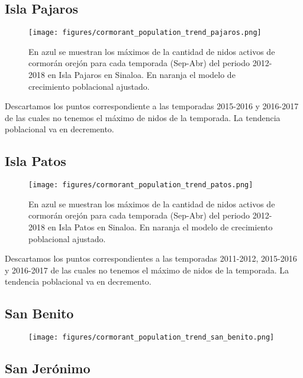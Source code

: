 \documentclass{article} %
\begin{document}
\subsection*{Isla Pajaros}

\begin{figure}[H]
\hspace{-2cm}
    \texttt{[image: figures/cormorant\_population\_trend\_pajaros.png]}
\caption{En azul se muestran los máximos de la cantidad de nidos activos de cormorán orejón para cada temporada (Sep-Abr) del periodo 2012-2018 en Isla Pajaros en Sinaloa. En naranja el modelo de crecimiento poblacional ajustado.}
\end{figure}

Descartamos los puntos correspondiente a las temporadas 2015-2016 y 2016-2017 de las cuales no tenemos el máximo de nidos de la temporada. La tendencia poblacional va en decremento.


\subsection*{Isla Patos}

\begin{figure}[H]
\hspace{-2cm}
    \texttt{[image: figures/cormorant\_population\_trend\_patos.png]}
\caption{En azul se muestran los máximos de la cantidad de nidos activos de cormorán orejón para cada temporada (Sep-Abr) del periodo 2012-2018 en Isla Patos en Sinaloa. En naranja el modelo de crecimiento poblacional ajustado.}
\end{figure}

Descartamos los puntos correspondientes a las temporadas 2011-2012, 2015-2016 y 2016-2017 de las cuales no tenemos el máximo de nidos de la temporada. La tendencia poblacional va en decremento.

\subsection*{San Benito}

\begin{figure}[H]
\hspace{-2cm}
    \texttt{[image: figures/cormorant\_population\_trend\_san\_benito.png]}
\caption{}
\end{figure}

\subsection*{San Jerónimo}
\end{document}
